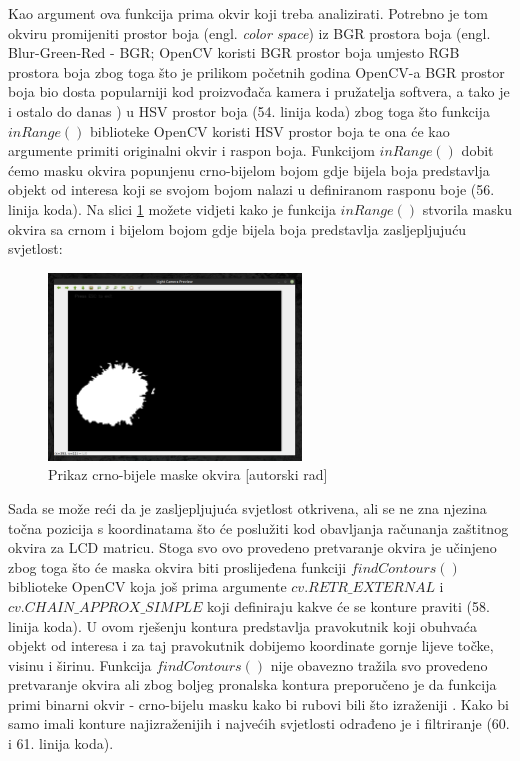\documentclass{foi}
\begin{document}
Kao argument ova funkcija prima okvir koji treba analizirati. Potrebno je tom okviru promijeniti prostor boja (engl. \emph{color space}) iz BGR prostora boja (engl. Blur-Green-Red - BGR; OpenCV koristi BGR prostor boja umjesto RGB prostora boja zbog toga što je prilikom početnih godina OpenCV-a BGR prostor boja bio dosta popularniji kod proizvođača kamera i pružatelja softvera, a tako je i ostalo do danas \cite{Satya}) u HSV prostor boja (54. linija koda) zbog toga što funkcija $inRange()$ biblioteke OpenCV koristi HSV prostor boja te ona će kao argumente primiti originalni okvir i raspon boja. Funkcijom $inRange()$ dobit ćemo masku okvira popunjenu crno-bijelom bojom gdje bijela boja predstavlja objekt od interesa koji se svojom bojom nalazi u definiranom rasponu boje \cite{OpenCV3} (56. linija koda). Na slici \ref{fig:maska} možete vidjeti kako je funkcija $inRange()$ stvorila masku okvira sa crnom i bijelom bojom gdje bijela boja predstavlja zasljepljujuću svjetlost:

\begin{figure}[h!]
    \centering
    \includegraphics[width=0.6\textwidth]{slike/cb_maska_okvir}
    \caption{Prikaz crno-bijele maske okvira [autorski rad]}
    \label{fig:maska}
\end{figure}

Sada se može reći da je zasljepljujuća svjetlost otkrivena, ali se ne zna njezina točna pozicija s koordinatama što će poslužiti kod obavljanja računanja zaštitnog okvira za LCD matricu. Stoga svo ovo provedeno pretvaranje okvira je učinjeno zbog toga što će maska okvira biti proslijeđena funkciji $findContours()$ biblioteke OpenCV koja još prima argumente $cv.RETR\_EXTERNAL$ i $cv.CHAIN\_APPROX\_SIMPLE$ koji definiraju kakve će se konture praviti (58. linija koda). U ovom rješenju kontura predstavlja pravokutnik koji obuhvaća objekt od interesa i za taj pravokutnik dobijemo koordinate gornje lijeve točke, visinu i širinu. Funkcija $findContours()$ nije obavezno tražila svo provedeno pretvaranje okvira ali zbog boljeg pronalska kontura preporučeno je da funkcija primi binarni okvir - crno-bijelu masku kako bi rubovi bili što izraženiji \cite{OpenCV4}. Kako bi samo imali konture najizraženijih i najvećih svjetlosti odrađeno je i filtriranje (60. i 61. linija koda).
\end{document}
